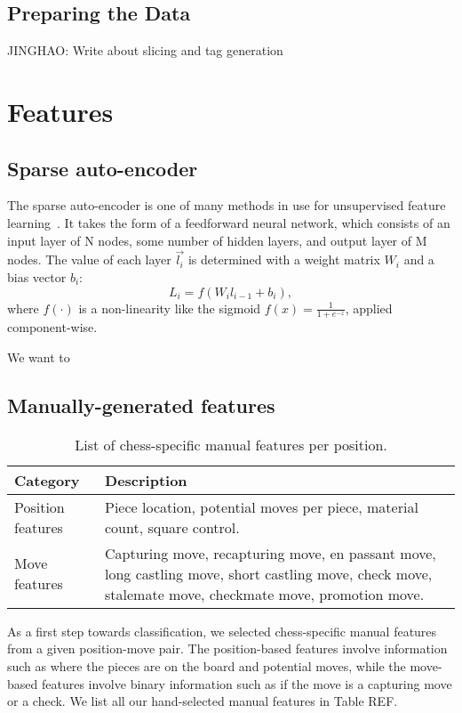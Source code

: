\documentclass[11pt]{article}
\begin{document}
\subsection{Preparing the Data}
JINGHAO: Write about slicing and tag generation

\section{Features}
\subsection{Sparse auto-encoder}
The sparse auto-encoder is one of many methods in use for unsupervised feature learning~\cite{single-layer-networks-unsupervised-feature-learning}. It takes the form of a feedforward neural network, which consists of an input layer of N nodes, some number of hidden layers, and output layer of M nodes. The value of each layer $\vec{l_i}$ is determined with a weight matrix $W_i$ and a bias vector $b_i$: \[L_i = f(W_i l_{i-1} + b_i),\] where $f(\cdot)$ is a non-linearity like the sigmoid $f(x) = \frac{1}{1 + e^{-z}}$, applied component-wise.

We want to 


\subsection{Manually-generated features}
\begin{table*}
\begin{tabular}{lp{}}
\hline
\textbf{Category} & \textbf{Description} \\ \hline
Position features & Piece location, potential moves per piece, material count, square control. \\
Move features & Capturing move, recapturing move, en passant move, long castling move, short castling move, check move, stalemate move, checkmate move, promotion move.
\hline
\end{tabular} 
\caption{List of chess-specific manual features per position.}
\end{table*}

As a first step towards classification, we selected chess-specific manual features from a given position-move pair.  The position-based features involve information such as where the pieces are on the board and potential moves, while the move-based features involve binary information such as if the move is a capturing move or a check.  We list all our hand-selected manual features in Table REF.
\end{document}
